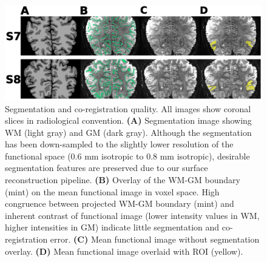 \begin{figure}[htbp!]
\centering
\includegraphics[width=\textwidth]{figures/chapter_03_SI/figS12.eps}
\caption{Segmentation and co-registration quality. All images show coronal slices in radiological convention. \textbf{(A)} Segmentation image showing WM (light gray) and GM (dark gray). Although the segmentation has been down-sampled to the slightly lower resolution of the functional space (0.6 mm isotropic to 0.8 mm isotropic), desirable segmentation features are preserved due to our surface reconstruction pipeline. \textbf{(B)} Overlay of the WM-GM boundary (mint) on the mean functional image in voxel space. High congruence between projected WM-GM boundary (mint) and inherent contrast of functional image (lower intensity values in WM, higher intensities in GM) indicate little segmentation and co-registration error. \textbf{(C)} Mean functional image without segmentation overlay. \textbf{(D)} Mean functional image overlaid with ROI (yellow).}
\label{fig:figC_segmQual}
\end{figure}

